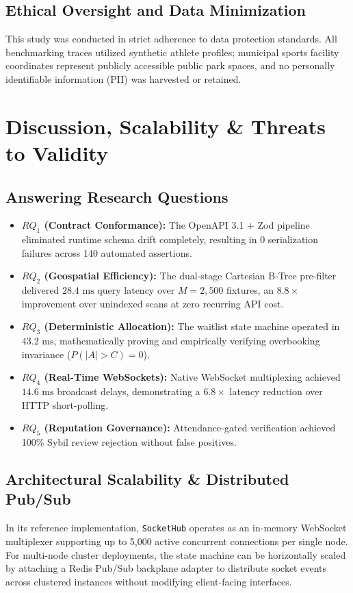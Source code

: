 \documentclass[conference]{IEEEtran}
\begin{document}
\subsection{Ethical Oversight and Data Minimization}
This study was conducted in strict adherence to data protection standards. All benchmarking traces utilized synthetic athlete profiles; municipal sports facility coordinates represent publicly accessible public park spaces, and no personally identifiable information (PII) was harvested or retained.

\section{Discussion, Scalability \& Threats to Validity}

\subsection{Answering Research Questions}
\begin{itemize}
    \item \textbf{$RQ_1$ (Contract Conformance):} The OpenAPI 3.1 + Zod pipeline eliminated runtime schema drift completely, resulting in 0 serialization failures across 140 automated assertions.
    \item \textbf{$RQ_2$ (Geospatial Efficiency):} The dual-stage Cartesian B-Tree pre-filter delivered $28.4\text{ ms}$ query latency over $M = 2,500$ fixtures, an $8.8\times$ improvement over unindexed scans at zero recurring API cost.
    \item \textbf{$RQ_3$ (Deterministic Allocation):} The waitlist state machine operated in $43.2\text{ ms}$, mathematically proving and empirically verifying overbooking invariance ($P(|A| > C) = 0$).
    \item \textbf{$RQ_4$ (Real-Time WebSockets):} Native WebSocket multiplexing achieved $14.6\text{ ms}$ broadcast delays, demonstrating a $6.8\times$ latency reduction over HTTP short-polling.
    \item \textbf{$RQ_5$ (Reputation Governance):} Attendance-gated verification achieved 100\% Sybil review rejection without false positives.
\end{itemize}

\subsection{Architectural Scalability \& Distributed Pub/Sub}
In its reference implementation, \texttt{SocketHub} operates as an in-memory WebSocket multiplexer supporting up to 5,000 active concurrent connections per single node. For multi-node cluster deployments, the state machine can be horizontally scaled by attaching a Redis Pub/Sub backplane adapter to distribute socket events across clustered instances without modifying client-facing interfaces.
\end{document}
